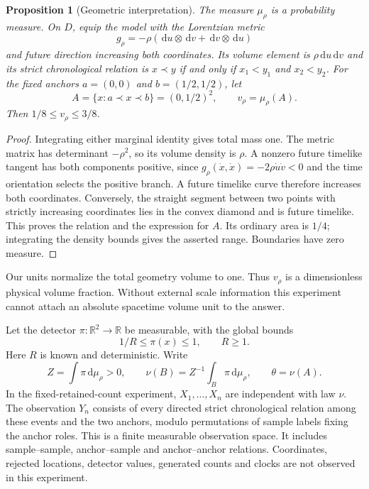 \documentclass[11pt]{article}
\newtheorem{proposition}[theorem]{Proposition}
\theoremstyle{remark}
\newcommand{\R}{\mathbb R}
\newcommand{\dd}{\,\mathrm d}
\begin{document}
\begin{proposition}[Geometric interpretation]\label{prop:geometry}
The measure $\mu_\rho$ is a probability measure. On $D$, equip the model
with the Lorentzian metric
\[
 g_\rho=-\rho(\dd u\otimes\dd v+\dd v\otimes\dd u)
\]
and future direction increasing both coordinates. Its volume element is
$\rho\dd u\dd v$ and its strict chronological relation is
$x\prec y$ if and only if $x_1<y_1$ and $x_2<y_2$.
For the fixed anchors $a=(0,0)$ and $b=(1/2,1/2)$, let
\[
 A=\{x:a\prec x\prec b\}=(0,1/2)^2,\qquad
 v_\rho=\mu_\rho(A).
\]
Then $1/8\le v_\rho\le3/8$.
\end{proposition}
\begin{proof}
Integrating either marginal identity gives total mass one. The metric
matrix has determinant $-\rho^2$, so its volume density is $\rho$.
A nonzero future timelike tangent has both components positive, since
$g_\rho(\dot x,\dot x)=-2\rho\dot u\dot v<0$ and the time orientation
selects the positive branch. A future timelike curve therefore increases
both coordinates. Conversely, the straight segment between two points
with strictly increasing coordinates lies in the convex diamond and is
future timelike. This proves the relation and the expression for $A$.
Its ordinary area is $1/4$; integrating the density bounds gives the
asserted range. Boundaries have zero measure.
\end{proof}

Our units normalize the total geometry volume to one. Thus $v_\rho$ is a
dimensionless physical volume fraction. Without external scale
information this experiment cannot attach an absolute spacetime volume
unit to the answer.

Let the detector $\pi:\R^2\to\R$ be measurable, with the global bounds
\begin{equation}\label{eq:detector}
 1/R\le\pi(x)\le1,\qquad R\ge1.
\end{equation}
Here $R$ is known and deterministic. Write
\[
 Z=\int\pi\dd\mu_\rho>0,\qquad
 \nu(B)=Z^{-1}\int_B\pi\dd\mu_\rho,\qquad \theta=\nu(A).
\]
In the fixed-retained-count experiment, $X_1,\ldots,X_n$ are independent
with law $\nu$. The observation $Y_n$ consists of every directed strict
chronological relation among these events and the two anchors, modulo
permutations of sample labels fixing the anchor roles. This is a finite
measurable observation space. It includes sample--sample, anchor--sample
and anchor--anchor relations. Coordinates, rejected locations, detector
values, generated counts and clocks are not observed in this experiment.
\end{document}
